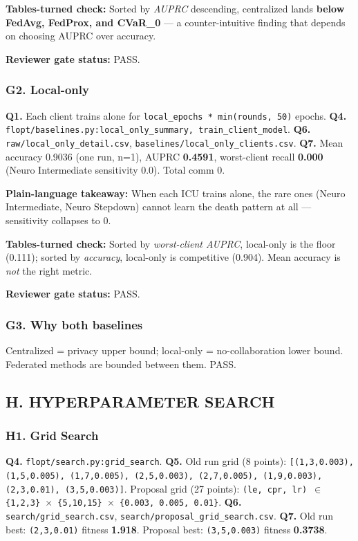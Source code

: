 \documentclass{article}
\begin{document}
\textbf{Tables-turned check:} Sorted by \emph{AUPRC} descending, centralized lands \textbf{below FedAvg, FedProx, and CVaR\_0} --- a counter-intuitive finding that depends on choosing AUPRC over accuracy.


\textbf{Reviewer gate status:} PASS.


\subsubsection{G2. Local-only}


\textbf{Q1.} Each client trains alone for \texttt{local\_epochs * min(rounds, 50)} epochs. \textbf{Q4.} \texttt{flopt/baselines.py:local\_only\_summary, train\_client\_model}. \textbf{Q6.} \texttt{raw/local\_only\_detail.csv}, \texttt{baselines/local\_only\_clients.csv}. \textbf{Q7.} Mean accuracy 0.9036 (one run, n=1), AUPRC \textbf{0.4591}, worst-client recall \textbf{0.000} (Neuro Intermediate sensitivity 0.0). Total comm 0.


\textbf{Plain-language takeaway:} When each ICU trains alone, the rare ones (Neuro Intermediate, Neuro Stepdown) cannot learn the death pattern at all --- sensitivity collapses to 0.


\textbf{Tables-turned check:} Sorted by \emph{worst-client AUPRC}, local-only is the floor (0.111); sorted by \emph{accuracy}, local-only is competitive (0.904). Mean accuracy is \emph{not} the right metric.


\textbf{Reviewer gate status:} PASS.


\subsubsection{G3. Why both baselines}


Centralized = privacy upper bound; local-only = no-collaboration lower bound. Federated methods are bounded between them. PASS.


\subsection{H. HYPERPARAMETER SEARCH}


\subsubsection{H1. Grid Search}


\textbf{Q4.} \texttt{flopt/search.py:grid\_search}. \textbf{Q5.} Old run grid (8 points): \texttt{[(1,3,0.003), (1,5,0.005), (1,7,0.005), (2,5,0.003), (2,7,0.005), (1,9,0.003), (2,3,0.01), (3,5,0.003)]}. Proposal grid (27 points): \texttt{(le, cpr, lr) \ensuremath{\in} \{1,2,3\} \ensuremath{\times} \{5,10,15\} \ensuremath{\times} \{0.003, 0.005, 0.01\}}. \textbf{Q6.} \texttt{search/grid\_search.csv}, \texttt{search/proposal\_grid\_search.csv}. \textbf{Q7.} Old run best: \texttt{(2,3,0.01)} fitness \textbf{1.918}. Proposal best: \texttt{(3,5,0.003)} fitness \textbf{0.3738}.
\end{document}
